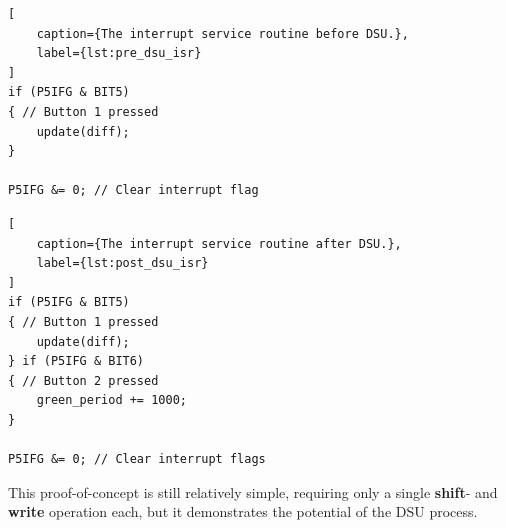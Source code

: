 \noindent\begin{minipage}{.45\textwidth}
\begin{lstlisting}[
    caption={The interrupt service routine before DSU.},
    label={lst:pre_dsu_isr}
]
if (P5IFG & BIT5)
{ // Button 1 pressed
    update(diff);
}

P5IFG &= 0; // Clear interrupt flag
\end{lstlisting}
\end{minipage}\hfill
\noindent\begin{minipage}{.45\textwidth}
\begin{lstlisting}[
    caption={The interrupt service routine after DSU.},
    label={lst:post_dsu_isr}
]
if (P5IFG & BIT5)
{ // Button 1 pressed
    update(diff);
} if (P5IFG & BIT6)
{ // Button 2 pressed
    green_period += 1000;
}

P5IFG &= 0; // Clear interrupt flags
\end{lstlisting}
\end{minipage}\hfill

This proof-of-concept is still relatively simple, requiring only a single \textbf{shift}- and \textbf{write} operation each, but it demonstrates the potential of the DSU process.
